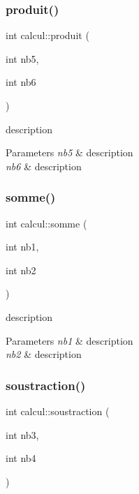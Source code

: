 \subsubsection{\texorpdfstring{produit()}{produit()}}
{\footnotesize\ttfamily int calcul\+::produit (\begin{DoxyParamCaption}\item[{int}]{nb5,  }\item[{int}]{nb6 }\end{DoxyParamCaption})}



description 


\begin{DoxyParams}{Parameters}
{\em nb5} & description \\
\hline
{\em nb6} & description \\
\hline
\end{DoxyParams}
\mbox{\label{classcalcul_aaab5926fb2fc504a256b9a91a3111875}} 
\subsubsection{\texorpdfstring{somme()}{somme()}}
{\footnotesize\ttfamily int calcul\+::somme (\begin{DoxyParamCaption}\item[{int}]{nb1,  }\item[{int}]{nb2 }\end{DoxyParamCaption})}



description 


\begin{DoxyParams}{Parameters}
{\em nb1} & description \\
\hline
{\em nb2} & description \\
\hline
\end{DoxyParams}
\mbox{\label{classcalcul_ae3eabefedbbd53ef7ffa2da8e1e33193}} 
\subsubsection{\texorpdfstring{soustraction()}{soustraction()}}
{\footnotesize\ttfamily int calcul\+::soustraction (\begin{DoxyParamCaption}\item[{int}]{nb3,  }\item[{int}]{nb4 }\end{DoxyParamCaption})}



